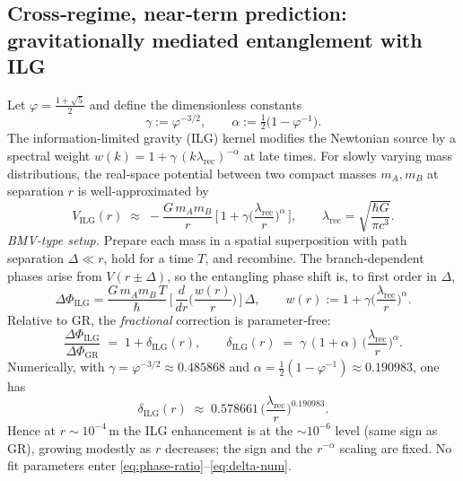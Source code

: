 \documentclass[11pt]{article}
\begin{document}
\subsection*{Cross‑regime, near‑term prediction: gravitationally mediated entanglement with ILG}

Let $\varphi=\tfrac{1+\sqrt{5}}{2}$ and define the dimensionless constants
\[
\gamma:=\varphi^{-3/2},
\qquad
\alpha:=\tfrac12\big(1-\varphi^{-1}\big).
\]
The information‑limited gravity (ILG) kernel modifies the Newtonian source by a spectral weight $w(k)\!=\!1+\gamma\,(k\lambda_{\mathrm{rec}})^{-\alpha}$ at late times. For slowly varying mass distributions, the real‑space potential between two compact masses $m_A,m_B$ at separation $r$ is well‑approximated by
\begin{equation}
V_{\mathrm{ILG}}(r)
\;\approx\;
-\frac{G\,m_A m_B}{r}\,\Big[\,1+\gamma\Big(\frac{\lambda_{\mathrm{rec}}}{r}\Big)^{\!\alpha}\,\Big],
\qquad
\lambda_{\mathrm{rec}}=\sqrt{\frac{\hbar G}{\pi c^3}}.
\label{eq:VILG}
\end{equation}
\emph{BMV‑type setup.} Prepare each mass in a spatial superposition with path separation $\Delta\ll r$, hold for a time $T$, and recombine. The branch‑dependent phases arise from $V(r\pm\Delta)$, so the entangling phase shift is, to first order in $\Delta$,
\begin{equation}
\Delta\Phi_{\mathrm{ILG}}
=
\frac{G\,m_A m_B\,T}{\hbar}\,
\Big[\,\frac{d}{dr}\Big(\frac{w(r)}{r}\Big)\,\Big]\,\Delta,
\qquad
w(r):=1+\gamma\Big(\frac{\lambda_{\mathrm{rec}}}{r}\Big)^{\!\alpha}.
\label{eq:BMVphase}
\end{equation}
Relative to GR, the \emph{fractional} correction is parameter‑free:
\begin{equation}
\frac{\Delta\Phi_{\mathrm{ILG}}}{\Delta\Phi_{\mathrm{GR}}}
\;=\;
1+\delta_{\mathrm{ILG}}(r),
\qquad
\delta_{\mathrm{ILG}}(r)
\;=\;
\gamma\,(1+\alpha)\,
\Big(\frac{\lambda_{\mathrm{rec}}}{r}\Big)^{\!\alpha}.
\label{eq:phase-ratio}
\end{equation}
Numerically, with $\gamma=\varphi^{-3/2}\approx 0.485868$ and $\alpha=\tfrac12(1-\varphi^{-1})\approx 0.190983$, one has
\begin{equation}
\delta_{\mathrm{ILG}}(r)
\;\approx\;
0.578661\,
\Big(\frac{\lambda_{\mathrm{rec}}}{r}\Big)^{0.190983}.
\label{eq:delta-num}
\end{equation}
Hence at $r\sim 10^{-4}\,\mathrm{m}$ the ILG enhancement is at the $\sim 10^{-6}$ level (same sign as GR), growing modestly as $r$ decreases; the sign and the $r^{-\alpha}$ scaling are fixed. No fit parameters enter \eqref{eq:phase-ratio}–\eqref{eq:delta-num}.
\end{document}
